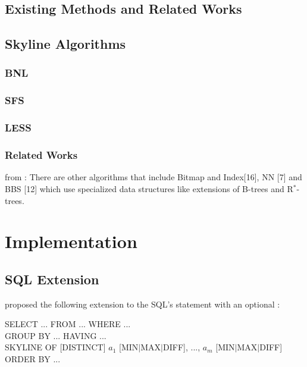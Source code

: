 \section{Existing Methods and Related Works}
\section{Skyline Algorithms}
\subsection{BNL}
\subsection{SFS}
\subsection{LESS}

\subsection{Related Works}
from \citep{Chaudhuri2006}: 
 There are other algorithms that include Bitmap and Index[16], NN
[7] and BBS [12] which use specialized data structures like
extensions of B-trees and R$^*$-trees.

\chapter{Implementation}
\section{SQL Extension}

\citet{Borzsonyi2001} proposed the following extension to the SQL's  statement with an optional :
\begin{sql}
SELECT ... FROM ... WHERE ... \\
GROUP BY ... HAVING ...       \\
SKYLINE OF \textnormal{[}DISTINCT\textnormal{]} $a_1$ \textnormal{[}MIN$|$MAX$|$DIFF\textnormal{]}, ..., $a_m$ \textnormal{[}MIN$|$MAX$|$DIFF\textnormal{]} \\
ORDER BY ...
\end{sql}

